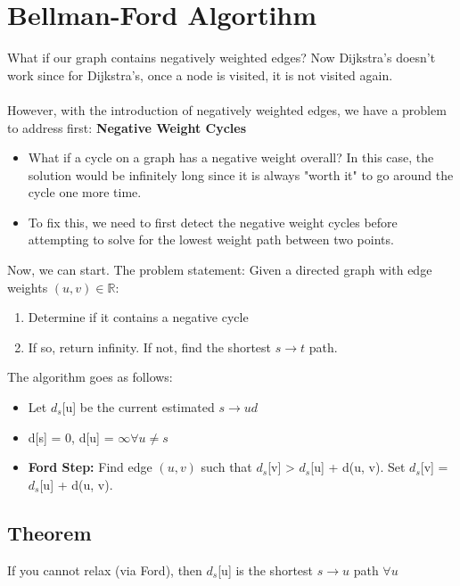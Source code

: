 \documentclass[10pt]{article}
\begin{document}
\section*{Bellman-Ford Algortihm}
What if our graph contains negatively weighted edges?  Now Dijkstra's doesn't work since for Dijkstra's, once a node is visited, it is not visited again.\\\\
However, with the introduction of negatively weighted edges, we have a problem to address first:
\textbf{Negative Weight Cycles}
\begin{itemize}
	\item What if a cycle on a graph has a negative weight overall?  In this case, the solution would be infinitely long since it is always "worth it" to go around the cycle one more time.
	\item To fix this, we need to first detect the negative weight cycles before attempting to solve for the lowest weight path between two points.
\end{itemize}
Now, we can start.  The problem statement: Given a directed graph with edge weights $(u, v) \in \mathbb{R}$:
\begin{enumerate}
	\item Determine if it contains a negative cycle
	\item If so, return infinity.  If not, find the shortest $s \rightarrow t$ path.
\end{enumerate}
The algorithm goes as follows:
\begin{itemize}
	\item Let $d_s$[u] be the current estimated $s \rightarrow ud$
	\item d[s] = 0, d[u] = $\infty \forall u \neq s$ 
	\item \textbf{Ford Step:} Find edge $(u, v)$ such that $d_s$[v] > $d_s$[u] + d(u, v).  Set $d_s$[v] = $d_s$[u] + d(u, v).
\end{itemize}


\subsection*{Theorem}
If you cannot relax (via Ford), then $d_s$[u] is the shortest $s \rightarrow u$ path $\forall u$
\end{document}
